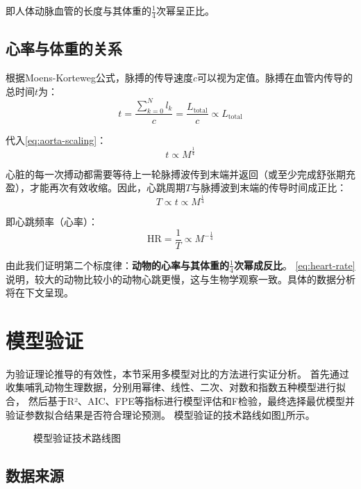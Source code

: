 即人体动脉血管的长度与其体重的$\frac{1}{4}$次幂呈正比。

\subsection{心率与体重的关系}

根据Moens-Korteweg公式，脉搏的传导速度$c$可以视为定值。脉搏在血管内传导的总时间$t$为：
\begin{equation}
t = \frac{\sum_{k=0}^{N} l_k}{c} = \frac{L_{\text{total}}}{c} \propto L_{\text{total}}
\label{eq:pulse-time}
\end{equation}

代入\cref{eq:aorta-scaling}：
\begin{equation}
t \propto M^{\frac{1}{4}}
\label{eq:time-scaling}
\end{equation}

心脏的每一次搏动都需要等待上一轮脉搏波传到末端并返回（或至少完成舒张期充盈），才能再次有效收缩。因此，心跳周期$T$与脉搏波到末端的传导时间成正比：
\begin{equation}
T \propto t \propto M^{\frac{1}{4}}
\label{eq:period-scaling}
\end{equation}

即心跳频率（心率）：
\begin{equation}
\text{HR} = \frac{1}{T} \propto M^{-\frac{1}{4}}
\label{eq:heart-rate}
\end{equation}

由此我们证明第二个标度律：\textbf{动物的心率与其体重的$\frac{1}{4}$次幂成反比}。
\cref{eq:heart-rate}说明，较大的动物比较小的动物心跳更慢，这与生物学观察一致。具体的数据分析将在下文呈现。

\section{模型验证}

为验证理论推导的有效性，本节采用多模型对比的方法进行实证分析。
首先通过收集哺乳动物生理数据，分别用幂律、线性、二次、对数和指数五种模型进行拟合，
然后基于R²、AIC、FPE等指标进行模型评估和F检验，最终选择最优模型并验证参数拟合结果是否符合理论预测。
模型验证的技术路线如图\ref{fig:validation-flowchart}所示。

\begin{figure}[H]
\centering
\resizebox{\textwidth}{!}{}
\caption{模型验证技术路线图}
\label{fig:validation-flowchart}
\end{figure}

\subsection{数据来源}

